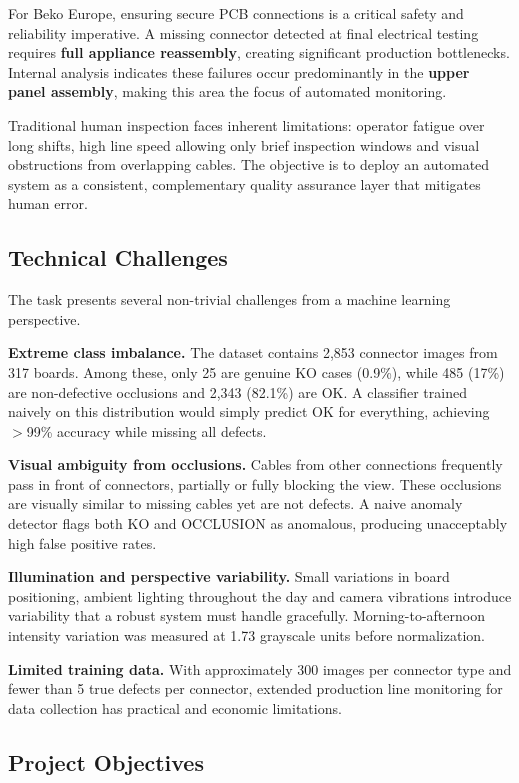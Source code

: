 \documentclass[11pt,a4paper,draft]{article}
\begin{document}
For Beko Europe, ensuring secure PCB connections is a critical safety and reliability imperative. A missing connector detected at final electrical testing requires \textbf{full appliance reassembly}, creating significant production bottlenecks. Internal analysis indicates these failures occur predominantly in the \textbf{upper panel assembly}, making this area the focus of automated monitoring.

Traditional human inspection faces inherent limitations: operator fatigue over long shifts, high line speed allowing only brief inspection windows and visual obstructions from overlapping cables. The objective is to deploy an automated system as a consistent, complementary quality assurance layer that mitigates human error.

\subsection{Technical Challenges}

The task presents several non-trivial challenges from a machine learning perspective.

\textbf{Extreme class imbalance.} The dataset contains 2{,}853 connector images from 317 boards. Among these, only 25 are genuine KO cases (0.9\%), while 485 (17\%) are non-defective occlusions and 2{,}343 (82.1\%) are OK. A classifier trained naively on this distribution would simply predict OK for everything, achieving $>$99\% accuracy while missing all defects.

\textbf{Visual ambiguity from occlusions.} Cables from other connections frequently pass in front of connectors, partially or fully blocking the view. These occlusions are visually similar to missing cables yet are not defects. A naive anomaly detector flags both KO and OCCLUSION as anomalous, producing unacceptably high false positive rates.

\textbf{Illumination and perspective variability.} Small variations in board positioning, ambient lighting throughout the day and camera vibrations introduce variability that a robust system must handle gracefully. Morning-to-afternoon intensity variation was measured at 1.73 grayscale units before normalization.

\textbf{Limited training data.} With approximately 300 images per connector type and fewer than 5 true defects per connector, extended production line monitoring for data collection has practical and economic limitations.

\subsection{Project Objectives}
\end{document}
